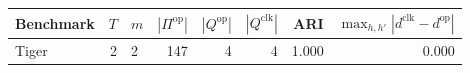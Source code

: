 \begin{tabular}{lrlrrrrr}
\toprule
Benchmark & $T$ & $m$ & $|\Pi^{\mathrm{op}}|$ & $|Q^{\mathrm{op}}|$ & $|Q^{\mathrm{clk}}|$ & ARI & $\max_{h,h'} |d^{\mathrm{clk}}-d^{\mathrm{op}}|$ \\
\midrule
Tiger & 2 & 2 & 147 & 4 & 4 & 1.000 & 0.000\\
\bottomrule
\end{tabular}
